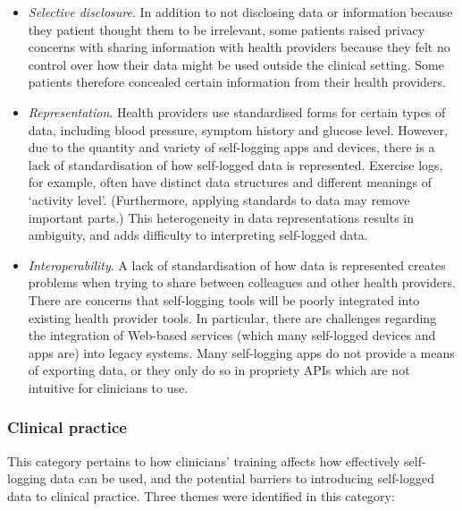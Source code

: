 \documentclass{sigchi}
\begin{document}
\begin{itemize}
    \item \textit{Selective disclosure}. In addition to not disclosing data or information because they patient thought them to be irrelevant, some patients raised privacy concerns with sharing information with health providers because they felt no control over how their data might be used outside the clinical setting. Some patients therefore concealed certain information from their health providers.
    
    \item \textit{Representation}. Health providers use standardised forms for certain types of data, including blood pressure, symptom history and glucose level. However, due to the quantity and variety of self-logging apps and devices, there is a lack of standardisation of how self-logged data is represented.  Exercise logs, for example, often have distinct data structures and different meanings of `activity level'. (Furthermore, applying standards to data may remove important parts.)  This heterogeneity in data representations results in ambiguity, and adds difficulty to interpreting self-logged data.
    
    \item \textit{Interoperability}. A lack of standardisation of how data is represented creates problems when trying to share between colleagues and other health providers. There are concerns that self-logging tools will be poorly integrated into existing health provider tools. In particular, there are challenges regarding the integration of Web-based services (which many self-logged devices and apps are) into legacy systems. Many self-logging apps do not provide a means of exporting data, or they only do so in propriety APIs which are not intuitive for clinicians to use.
\end{itemize}

\subsubsection{Clinical practice}

This category pertains to how clinicians' training affects how effectively self-logging data can be used, and the potential barriers to introducing self-logged data to clinical practice. Three themes were identified in this category:
\end{document}
